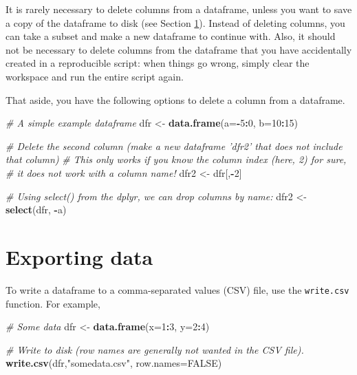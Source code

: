 \documentclass[]{book}
\newenvironment{Shaded}{\begin{snugshade}}{\end{snugshade}}
\newcommand{\CommentTok}[1]{\textcolor[rgb]{0.56,0.35,0.01}{\textit{#1}}}
\newcommand{\DataTypeTok}[1]{\textcolor[rgb]{0.13,0.29,0.53}{#1}}
\newcommand{\DecValTok}[1]{\textcolor[rgb]{0.00,0.00,0.81}{#1}}
\newcommand{\KeywordTok}[1]{\textcolor[rgb]{0.13,0.29,0.53}{\textbf{#1}}}
\newcommand{\NormalTok}[1]{#1}
\newcommand{\OperatorTok}[1]{\textcolor[rgb]{0.81,0.36,0.00}{\textbf{#1}}}
\newcommand{\OtherTok}[1]{\textcolor[rgb]{0.56,0.35,0.01}{#1}}
\newcommand{\StringTok}[1]{\textcolor[rgb]{0.31,0.60,0.02}{#1}}
\begin{document}
It is rarely necessary to delete columns from a dataframe, unless you want to save a copy of the dataframe to disk (see Section \ref{exportingdata}). Instead of deleting columns, you can take a subset and make a new dataframe to continue with. Also, it should not be necessary to delete columns from the dataframe that you have accidentally created in a reproducible script: when things go wrong, simply clear the workspace and run the entire script again.

That aside, you have the following options to delete a column from a dataframe.

\begin{Shaded}
\begin{Highlighting}[]
\CommentTok{# A simple example dataframe}
\NormalTok{dfr <-}\StringTok{ }\KeywordTok{data.frame}\NormalTok{(}\DataTypeTok{a=}\OperatorTok{-}\DecValTok{5}\OperatorTok{:}\DecValTok{0}\NormalTok{, }\DataTypeTok{b=}\DecValTok{10}\OperatorTok{:}\DecValTok{15}\NormalTok{)}

\CommentTok{# Delete the second column (make a new dataframe 'dfr2' that does not include that column)}
\CommentTok{# This only works if you know the column index (here, 2) for sure,}
\CommentTok{# it does not work with a column name!}
\NormalTok{dfr2 <-}\StringTok{ }\NormalTok{dfr[,}\OperatorTok{-}\DecValTok{2}\NormalTok{]}

\CommentTok{# Using select() from the dplyr, we can drop columns by name:}
\NormalTok{dfr2 <-}\StringTok{ }\KeywordTok{select}\NormalTok{(dfr, }\OperatorTok{-}\NormalTok{a)}
\end{Highlighting}
\end{Shaded}

\hypertarget{exportingdata}{%
\section{Exporting data}\label{exportingdata}}

To write a dataframe to a comma-separated values (CSV) file, use the \texttt{write.csv} function. For example,

\begin{Shaded}
\begin{Highlighting}[]
\CommentTok{# Some data}
\NormalTok{dfr <-}\StringTok{ }\KeywordTok{data.frame}\NormalTok{(}\DataTypeTok{x=}\DecValTok{1}\OperatorTok{:}\DecValTok{3}\NormalTok{, }\DataTypeTok{y=}\DecValTok{2}\OperatorTok{:}\DecValTok{4}\NormalTok{)}

\CommentTok{# Write to disk (row names are generally not wanted in the CSV file).}
\KeywordTok{write.csv}\NormalTok{(dfr,}\StringTok{"somedata.csv"}\NormalTok{, }\DataTypeTok{row.names=}\OtherTok{FALSE}\NormalTok{)}
\end{Highlighting}
\end{Shaded}
\end{document}
